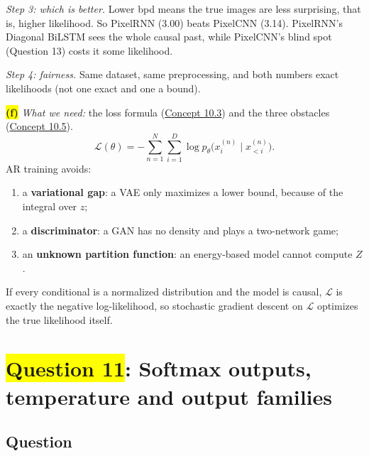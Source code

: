 \documentclass[12pt,a4paper]{article}
\begin{document}
\emph{Step 3: which is better.} Lower bpd means the true images are less surprising, that is, higher likelihood. So PixelRNN (3.00) beats PixelCNN (3.14). PixelRNN's Diagonal BiLSTM sees the whole causal past, while PixelCNN's blind spot (Question 13) costs it some likelihood.

\emph{Step 4: fairness.} Same dataset, same preprocessing, and both numbers exact likelihoods (not one exact and one a bound).

\colorbox{yellow}{\textbf{(f)}} \emph{What we need:} the loss formula (\hyperref[c10-3]{Concept 10.3}) and the three obstacles (\hyperref[c10-5]{Concept 10.5}).
\[
\mathcal{L}(\theta)=-\sum_{n=1}^{N}\sum_{i=1}^{D}\log p_\theta\big(x_i^{(n)}\mid x_{<i}^{(n)}\big).
\]
AR training avoids:
\begin{enumerate}[nosep]
  \item a \textbf{variational gap}: a VAE only maximizes a lower bound, because of the integral over $z$;
  \item a \textbf{discriminator}: a GAN has no density and plays a two-network game;
  \item an \textbf{unknown partition function}: an energy-based model cannot compute $Z$.
\end{enumerate}
If every conditional is a normalized distribution and the model is causal, $\mathcal{L}$ is exactly the negative log-likelihood, so stochastic gradient descent on $\mathcal{L}$ optimizes the true likelihood itself.
\newpage
\section{\texorpdfstring{\colorbox{yellow}{Question 11}}{Question 11}: Softmax outputs, temperature and output families}

\subsection{Question}
\end{document}
